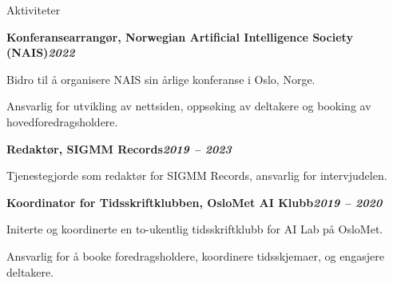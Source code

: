 \begin{rubric}{Aktiviteter}
\begin{compactitem}
\end{compactitem}
%
\entry*[]%
\textbf{Konferansearrangør, Norwegian Artificial Intelligence Society (NAIS)\hfill\textit{2022}} \par
\begin{compactitem}
    \item Bidro til å organisere NAIS sin årlige konferanse i Oslo, Norge.
    \item Ansvarlig for utvikling av nettsiden, oppsøking av deltakere og booking av hovedforedragsholdere.
    \vspace{-12pt}
\end{compactitem}
%
\entry*[]%
\textbf{Redaktør, SIGMM Records\hfill\textit{2019 -- 2023}} \par
\begin{compactitem}
    \item Tjenestegjorde som redaktør for SIGMM Records, ansvarlig for intervjudelen.
    \vspace{-12pt}
\end{compactitem}
%
\entry*[]%
\textbf{Koordinator for Tidsskriftklubben, OsloMet AI Klubb\hfill\textit{2019 -- 2020}} \par
\begin{compactitem}
    \item Initerte og koordinerte en to-ukentlig tidsskriftklubb for AI Lab på OsloMet.
    \item Ansvarlig for å booke foredragsholdere, koordinere tidsskjemaer, og engasjere deltakere.
    \vspace{-12pt}
\end{compactitem}
\end{rubric}
